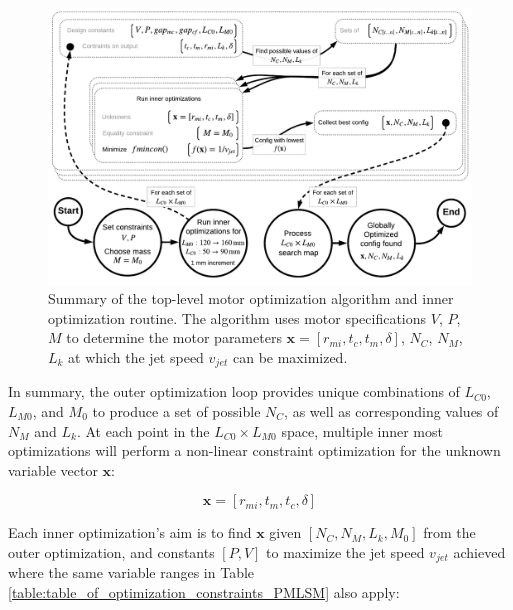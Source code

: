             \begin{figure}[h]
              \centering
              \includegraphics[width=5.8in]{chap3/images/HM_PMLSM_optimization.pdf}
              \caption{Summary of the top-level motor optimization algorithm and inner optimization routine. The algorithm uses motor specifications $V$, $P$, $M$ to determine the motor parameters $\textbf{x}=[r_{mi},t_c,t_m,\delta]$, $N_C$, $N_M$, $L_k$ at which the jet speed $v_{jet}$ can be maximized.}
              \label{fig:chapter/hm/top level optmization}
            \end{figure}
            
            
            In summary, the outer optimization loop provides unique combinations of $L_{C0}$, $L_{M0}$, and $M_0$ to produce a set of possible $N_C$, as well as corresponding values of $N_M$ and $L_k$. At each point in the $L_{C0} \times L_{M0}$ space, multiple inner most optimizations will perform a non-linear constraint optimization for the unknown variable vector $\textbf{x}$:
            
            
            \begin{equation}
                \textbf{x} = \left[ r_{mi}, t_m, t_c, \delta\right]
                \label{eq:inner optimization x}
            \end{equation}
            
            
            Each inner optimization's aim is to find $\textbf{x}$ given $\left[N_C,N_M,L_k,M_0\right]$ from the outer optimization, and constants $\left[P,V\right]$ to maximize the jet speed $v_{jet}$ achieved where the same variable ranges in Table\,\ref{table:table_of_optimization_constraints_PMLSM} also apply: 
            
